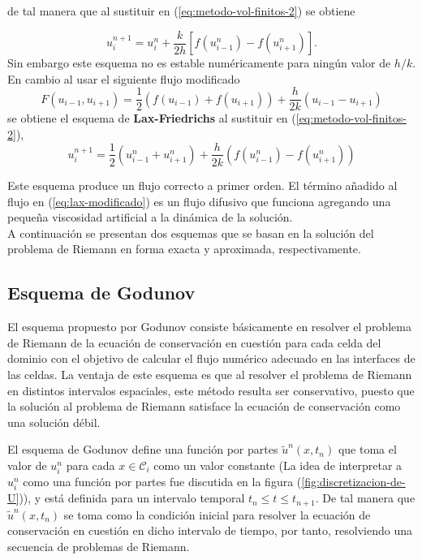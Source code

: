 de tal manera que al sustituir en (\ref{eq:metodo-vol-finitos-2}) se obtiene

\begin{equation}
	u_{i}^{n+1} = u_{i}^{n} 
	+ \frac{k}{2h}\left[ f(u_{i-1}^{n}) - f(u_{i+1}^{n}) \right].
\end{equation}
Sin embargo este esquema no es estable numéricamente para ningún valor de $h/k$. En cambio al usar el siguiente flujo modificado
\begin{equation}
	F(u_{i-1}, u_{i+1}) = \frac{1}{2}\left(f(u_{i-1}) + f(u_{i+	1})\right) + \frac{h}{2k} \left(u_{i-1} - u_{i+1} \right)
	\label{eq:lax-modificado}
\end{equation}
se obtiene el esquema de \textbf{Lax-Friedrichs} al sustituir en (\ref{eq:metodo-vol-finitos-2}), 
\begin{equation}
	u_{i}^{n+1} = \frac{1}{2}\left(u_{i-1}^{n} + u_{i+1}^{n}\right) + \frac{h}{2k} \left(f(u_{i-1}^{n}) - f(u_{i+1}^{n})\right)
\end{equation}

Este esquema produce un flujo correcto a primer orden. El término añadido al flujo en (\ref{eq:lax-modificado}) es un flujo difusivo que funciona agregando una pequeña viscosidad artificial a la dinámica de la solución.\\

A continuación se presentan dos esquemas que se basan en la solución del problema de Riemann en forma exacta y aproximada, respectivamente.

\subsection{Esquema de Godunov}
\label{sec:Godunov}
El esquema propuesto por Godunov consiste básicamente en resolver el problema de Riemann de la ecuación de conservación en cuestión para cada celda del dominio con el objetivo de calcular el flujo numérico adecuado en las interfaces de las celdas. La ventaja de este esquema es que al resolver el problema de Riemann en distintos intervalos espaciales, este método resulta ser conservativo, puesto que la solución al problema de Riemann satisface la ecuación de conservación como una solución débil.

El esquema de Godunov define una función por partes $\tilde{u}^{n}(x,t_n)$ que toma el valor de $u_{i}^{n}$ para cada $x \in \mathcal{C}_i$ como un valor constante (La idea de interpretar a $u_{i}^{n}$ como una función por partes fue discutida en la figura (\ref{fig:discretizacion-de-U})), y está definida para un intervalo temporal $t_{n}\leq t \leq t_{n+1}$. De tal manera que $\tilde{u}^{n}(x,t_n)$ se toma como la condición inicial para resolver la ecuación de conservación en cuestión en dicho intervalo de tiempo, por tanto, resolviendo una secuencia de problemas de Riemann.

